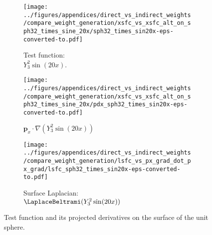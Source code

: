 
\begin{figure}
\begin{center}
	\centering
	\begin{subfigure}[t]{0.75in}
	\centering
	\texttt{[image: ../figures/appendices/direct\_vs\_indirect\_weights/compare\_weight\_generation/xsfc\_vs\_xsfc\_alt\_on\_sph32\_times\_sine\_20x/sph32\_times\_sin20x-eps-converted-to.pdf]}
	\caption{Test function:  \\ $Y_{3}^{2} \sin(20 x) $.  }
		\label{fig:direct_vs_indirect_manufactured_base}
	\end{subfigure}
	
	\begin{subfigure}[h]{0.75in}
		\centering
	\texttt{[image: ../figures/appendices/direct\_vs\_indirect\_weights/compare\_weight\_generation/xsfc\_vs\_xsfc\_alt\_on\_sph32\_times\_sine\_20x/pdx\_sph32\_times\_sin20x-eps-converted-to.pdf]}
	\caption{$\mathbf{p}_{x} \cdot \nabla ( Y_{3}^{2} \sin(20 x))$ }
			\label{fig:direct_vs_indirect_manufactured_xsfc}
	\end{subfigure}
	\begin{subfigure}[h]{.75in}
		\centering
	\texttt{[image: ../figures/appendices/direct\_vs\_indirect\_weights/compare\_weight\_generation/lsfc\_vs\_px\_grad\_dot\_px\_grad/lsfc\_sph32\_times\_sin20x-eps-converted-to.pdf]}
	\caption{Surface Laplacian: \\ $\LaplaceBeltrami ( Y_{3}^{2} \sin(20 x) )$  }
				\label{fig:direct_vs_indirect_manufactured_lsfc}
	\end{subfigure}
	\caption{Test function and its projected derivatives on the surface of the unit sphere. }
				\label{fig:direct_vs_indirect_manufactured_solution}
	\end{center}
\end{figure}

